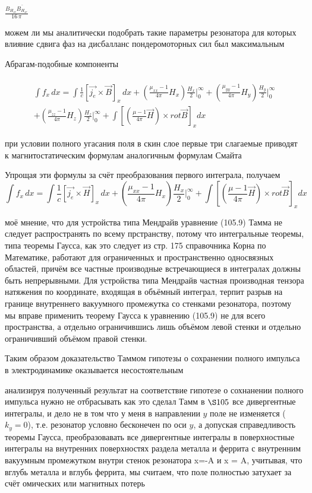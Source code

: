 \documentclass[11pt]{article}
\begin{document}
    $\displaystyle \frac{B_{H_{\mathit{zr}}} \overline{B_{H_{\mathit{zr}}}}}{16 \, \pi}$


    можем ли мы аналитически подобрать такие параметры резонатора для
которых влияние сдвига фаз на дисбалланс пондеромоторных сил был
максимальным

    Абрагам-подобные компоненты

    \[\begin{array}{c} \\
\int f_x \, dx
= \int \frac{1}{c} \left[\vec {j_e} \times \vec{B} \right]_x \, dx
+ \left(\frac{\mu_{xx} - 1}{4 \pi}H_x\right) \frac{H_x}{2} \Bigg|_{0}^{\infty}
+ \left(\frac{\mu_{yy} - 1}{4 \pi}H_y\right) \frac{H_y}{2} \Bigg|_{0}^{\infty} \\
+ \left(\frac{\mu_{zz} - 1}{4 \pi}H_z\right) \frac{H_z}{2} \Bigg|_{0}^{\infty}
+ \int \left[\left(\frac{\mu - 1}{4 \pi}\vec{H}\right) \times rot \vec{B}\right]_x dx
\end{array}\]

при условии полного угасания поля в скин слое первые три слагаемые
приводят к магнитостатическим формулам аналогичным формулам Смайта

Упрощая эти формулы за счёт преобразования первого интеграла, получаем
\[
\int f_x \, dx
= \int \frac{1}{c} \left[\vec {j_e} \times \vec{H} \right]_x \, dx
+ \left(\frac{\mu_{xx} - 1}{4 \pi}H_x\right) \frac{H_x}{2} \Bigg|_{0}^{\infty}
+ \int \left[\left(\frac{\mu - 1}{4 \pi}\vec{H}\right) \times rot \vec{B}\right]_x dx
\]

    моё мнение, что для устройства типа Мендрайв уравнение (105.9) Тамма не
следует распространять по всему прстранству, потому что интегральные
теоремы, типа теоремы Гаусса, как это следует из стр. 175 справочника
Корна по Математике, работают для ограниченных и пространственно
односвязных областей, причём все частные производные встречающиеся в
интегралах должны быть непрерывными. Для устройства типа Мендрайв
частная производная тензора натяжения по координате, входящая в объёмный
интеграл, терпит разрыв на границе внутреннего вакуумного промежутка со
стенками резонатора, поэтому мы вправе применить теорему Гаусса к
уравнению (105.9) не для всего пространства, а отдельно ограничившись
лишь объёмом левой стенки и отдельно ограничивший объёмом правой стенки.

Таким образом доказательство Таммом гипотезы о сохранении полного
импульса в электродинамике оказывается несостоятельным

    анализируя полученный результат на соответствие гипотезе о сохнанении
полного импульса нужно не отбрасывать как это сделал Тамм в \(\S 105\)
все дивергентные интегралы, и дело не в том что у меня в направлении
\(y\) поле не изменяется (\(k_y = 0\)), т.е. резонатор условно
бесконечен по оси \(y\), а допуская справедливость теоремы Гаусса,
преобразовавать все дивергентные интегралы в поверхностные интегралы на
внутренних поверхностях раздела металла и феррита с внутренним вакуумным
промежутком внутри стенок резонатора x=-A и x = A, учитывая, что вглубь
металла и вглубь феррита, мы считаем, что поле полностью затухает за
счёт омических или магнитных потерь
\end{document}

